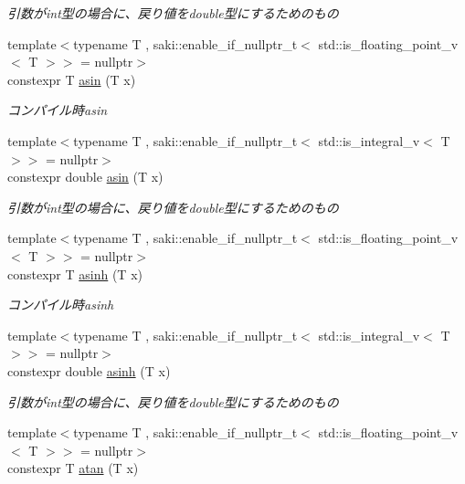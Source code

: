 \begin{DoxyCompactItemize}
\begin{DoxyCompactList}\small\item\em 引数がint型の場合に、戻り値をdouble型にするためのもの \end{DoxyCompactList}\item 
{\footnotesize template$<$typename T , saki\+::enable\+\_\+if\+\_\+nullptr\+\_\+t$<$ std\+::is\+\_\+floating\+\_\+point\+\_\+v$<$ T $>$$>$  = nullptr$>$ }\\constexpr T \mbox{\hyperlink{namespacesaki_a63f2b40515cd62b037dade64aa8465db}{asin}} (T x)
\begin{DoxyCompactList}\small\item\em コンパイル時asin \end{DoxyCompactList}\item 
{\footnotesize template$<$typename T , saki\+::enable\+\_\+if\+\_\+nullptr\+\_\+t$<$ std\+::is\+\_\+integral\+\_\+v$<$ T $>$$>$  = nullptr$>$ }\\constexpr double \mbox{\hyperlink{namespacesaki_aac285debedd1f53761a838c0e4f57af0}{asin}} (T x)
\begin{DoxyCompactList}\small\item\em 引数がint型の場合に、戻り値をdouble型にするためのもの \end{DoxyCompactList}\item 
{\footnotesize template$<$typename T , saki\+::enable\+\_\+if\+\_\+nullptr\+\_\+t$<$ std\+::is\+\_\+floating\+\_\+point\+\_\+v$<$ T $>$$>$  = nullptr$>$ }\\constexpr T \mbox{\hyperlink{namespacesaki_ab097a2d600f313b6bdd3099e61a10b9e}{asinh}} (T x)
\begin{DoxyCompactList}\small\item\em コンパイル時asinh \end{DoxyCompactList}\item 
{\footnotesize template$<$typename T , saki\+::enable\+\_\+if\+\_\+nullptr\+\_\+t$<$ std\+::is\+\_\+integral\+\_\+v$<$ T $>$$>$  = nullptr$>$ }\\constexpr double \mbox{\hyperlink{namespacesaki_aac840ca5d9b98ac0a8c5b15752f02072}{asinh}} (T x)
\begin{DoxyCompactList}\small\item\em 引数がint型の場合に、戻り値をdouble型にするためのもの \end{DoxyCompactList}\item 
{\footnotesize template$<$typename T , saki\+::enable\+\_\+if\+\_\+nullptr\+\_\+t$<$ std\+::is\+\_\+floating\+\_\+point\+\_\+v$<$ T $>$$>$  = nullptr$>$ }\\constexpr T \mbox{\hyperlink{namespacesaki_a524b9439c745f69bd8a8b681b03b4b01}{atan}} (T x)

\end{DoxyCompactItemize}

